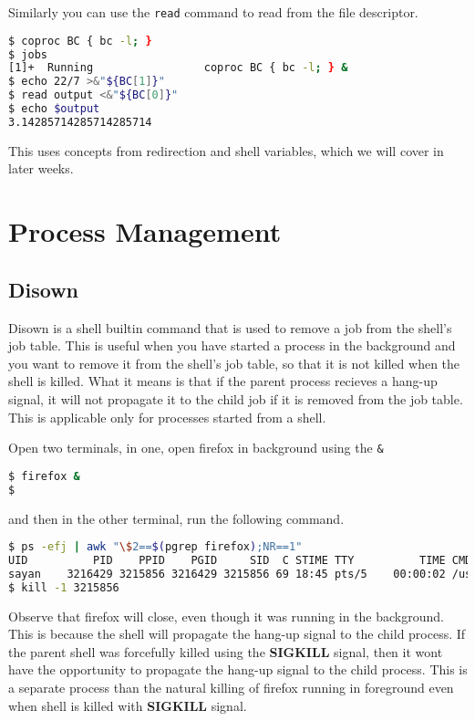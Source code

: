 Similarly you can use the \texttt{read} command to read from the file descriptor.

\begin{lstlisting}[language=bash]
$ coproc BC { bc -l; }
$ jobs
[1]+  Running                 coproc BC { bc -l; } &
$ echo 22/7 >&"${BC[1]}"
$ read output <&"${BC[0]}"
$ echo $output
3.14285714285714285714
\end{lstlisting}

This uses concepts from redirection and shell variables, which we will cover
in later weeks.


\section{Process Management}
\subsection{Disown}

Disown is a shell builtin command that is used to remove a job from the shell's
job table. This is useful when you have started a process in the background
and you want to remove it from the shell's job table, so that it is not
killed when the shell is killed. What it means is that if the parent
process recieves a hang-up signal, it will not propagate it to the child
job if it is removed from the job table.
This is applicable only for processes started from a shell.

Open two terminals, in one, open firefox in background using the \texttt{\&}

\begin{lstlisting}[language=bash]
$ firefox &
$
\end{lstlisting}

and then in the other terminal, run the following command.

\begin{lstlisting}[language=bash]
$ ps -efj | awk "\$2==$(pgrep firefox);NR==1"
UID          PID    PPID    PGID     SID  C STIME TTY          TIME CMD
sayan    3216429 3215856 3216429 3215856 69 18:45 pts/5    00:00:02 /usr/lib/firefox/firefox
$ kill -1 3215856
\end{lstlisting}

Observe that firefox will close, even though it was running in the background.
This is because the shell will propagate the hang-up signal to the child process.
If the parent shell was forcefully killed using the \textbf{SIGKILL} signal,
then it wont have the opportunity to propagate the hang-up signal to the child process.
This is a separate process than the natural killing of firefox running in
foreground even when shell is killed with \textbf{SIGKILL} signal.

